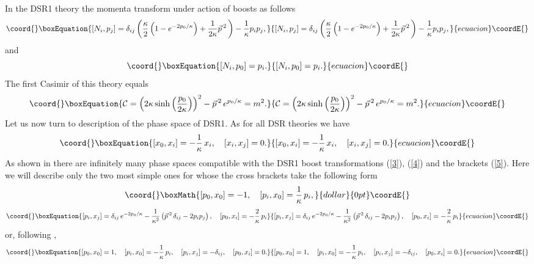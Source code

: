 \documentclass  [12pt] {article}
\begin{document}
In the DSR1 theory the momenta transform under action of boosts as follows
\begin{equation}\coord{}\boxEquation{\label{2}
   \left[N_{i}, p_{j}\right] =   \delta_{ij}
 \left( {\kappa\over 2} \left(
 1 -e^{-2{p_{0}/ \kappa}}
\right) + {1\over 2\kappa} \vec{p}\,{}^{ 2}\, \right) -  {1\over \kappa}
p_{i}p_{j} ,
}{\left[N_{i}, p_{j}\right] =   \delta_{ij}
 \left( {\kappa\over 2} \left(
 1 -e^{-2{p_{0}/ \kappa}}
\right) + {1\over 2\kappa} \vec{p}\,{}^{ 2}\, \right) -  {1\over \kappa}
p_{i}p_{j} ,
}{ecuacion}\coordE{}\end{equation}
and
\begin{equation}\coord{}\boxEquation{\label{3}
  \left[N_{i},p_{0}\right] =  p_{i}.
}{\left[N_{i},p_{0}\right] =  p_{i}.
}{ecuacion}\coordE{}\end{equation}
The first Casimir of this theory equals
\begin{equation}\coord{}\boxEquation{\label{4}
{\cal C}  = \left(2\kappa \sinh \left(\frac{p_0}{2\kappa}\right)\right)^2 -
\vec{p}\,{}^2\, e^{p_0/\kappa}=m^2.
}{{\cal C}  = \left(2\kappa \sinh \left(\frac{p_0}{2\kappa}\right)\right)^2 -
\vec{p}\,{}^2\, e^{p_0/\kappa}=m^2.
}{ecuacion}\coordE{}\end{equation}
Let us now turn to description of the phase space of DSR1. As for all DSR
theories we have
\begin{equation}\coord{}\boxEquation{\label{5}
  [x_0, x_i] = -\frac{1}{\kappa}\, x_i, \quad [x_i, x_j] = 0.
}{[x_0, x_i] = -\frac{1}{\kappa}\, x_i, \quad [x_i, x_j] = 0.
}{ecuacion}\coordE{}\end{equation}
As shown in \cite{jsnew} there are infinitely many phase spaces compatible with
the DSR1 boost transformations (\ref{3}), (\ref{4}) and the brackets (\ref{5}).
Here we will describe only the two most simple ones for whose the cross
brackets take the following form
$$\coord{}\boxMath{ [p_0,
x_0] = -1, \quad [p_i, x_0] =  \frac{1}\kappa\, p_i,
}{dollar}{0pt}\coordE{}$$
\begin{equation}\coord{}\boxEquation{\label{6}
[p_i, x_j] =  \delta_{ij} \, e^{- 2p_0/\kappa}
-\frac{1}{\kappa^2}\left(\vec{p}\,{}^{ 2}\, \delta_{ij} - 2 p_{i}p_{j}\right),
\quad [p_0, x_i] = -\frac{2}\kappa\, p_i
}{[p_i, x_j] =  \delta_{ij} \, e^{- 2p_0/\kappa}
-\frac{1}{\kappa^2}\left(\vec{p}\,{}^{ 2}\, \delta_{ij} - 2 p_{i}p_{j}\right),
\quad [p_0, x_i] = -\frac{2}\kappa\, p_i
}{ecuacion}\coordE{}\end{equation}
or, following \cite{maru}, \cite{Lukierski:1993wx}
\begin{equation}\coord{}\boxEquation{\label{6a}
  [p_0, x_0] = 1, \quad [p_i, x_0] =  -\frac{1}\kappa\, p_i, \quad [p_i, x_j] =-
 \delta_{ij} , \quad [p_0, x_i] =0.
}{[p_0, x_0] = 1, \quad [p_i, x_0] =  -\frac{1}\kappa\, p_i, \quad [p_i, x_j] =-
 \delta_{ij} , \quad [p_0, x_i] =0.
}{ecuacion}\coordE{}\end{equation}
\end{document}
